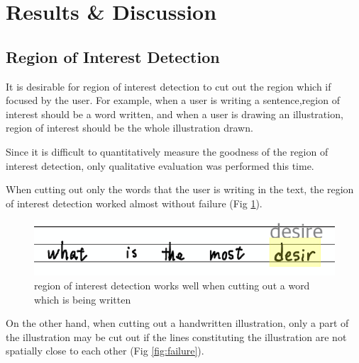 \section{Results \& Discussion}
\label{section:result-discussion}

\subsection{Region of Interest Detection}

It is desirable for region of interest detection to cut out the region which if focused by
the user. For example, when a user is writing a sentence,region of interest should be a word
written, and when a user is drawing an illustration, region of interest should be the whole
illustration drawn.

Since it is difficult to quantitatively measure the goodness of the region of interest detection,
only qualitative evaluation was performed this time.

When cutting out only the words that the user is writing in the text,
the region of interest detection worked almost without failure (Fig \ref{fig:cutting-word-region}).

\begin{figure}
    \centering
    \includegraphics[scale=0.6]{images/word_region.png}
    \caption{region of interest detection works well when cutting out a word which is being written}
    \label{fig:cutting-word-region}
\end{figure}

On the other hand, when cutting out a handwritten illustration,
only a part of the illustration may be cut out if the lines constituting
the illustration are not spatially close to each other (Fig \ref{fig:failure}).

